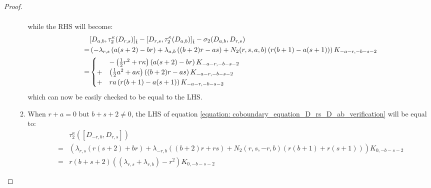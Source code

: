 \begin{proof}
\begin{enumerate}
\begin{enumerate}
$$\begin{aligned}
                                \end{aligned}
                            $$
                        while the RHS will become:
                            $$
                                \begin{aligned}
                                    & [D_{a, b}, \tau_2^{\kappa}(D_{r, s})]_{\extendedtoroidal} - [D_{r, s}, \tau_2^{\kappa}(D_{a, b})]_{\extendedtoroidal} - \sigma_2(D_{a, b}, D_{r, s})
                                    \\
                                    = & \left( -\lambda_{r, s} \left( a(s + 2) - br \right) + \lambda_{a, b} \left( (b + 2) r - as \right) + N_2(r, s, a, b)\left( r(b + 1) - a(s + 1) \right) \right) K_{-a - r, -b - s - 2}
                                    \\
                                    = &
                                    \begin{cases}
                                        & -\left( \frac12 r^2 + r\kappa \right) \left( a(s + 2) - br \right) K_{-a - r, -b - s - 2}
                                        \\
                                        + & \left( \frac12 a^2 + a\kappa \right) \left( (b + 2) r - as \right) K_{-a - r, -b - s - 2} 
                                        \\
                                        + & ra\left( r(b + 1) - a(s + 1) \right) K_{-a - r, -b - s - 2}
                                    \end{cases}
                                \end{aligned}
                            $$
                        which can now be easily checked to be equal to the LHS.
                        \item When $r + a = 0$ but $b + s + 2 \not = 0$, the LHS of equation \eqref{equation: coboundary_equation_D_rs_D_ab_verification} will be equal to:
                            $$
                                \begin{aligned}
                                    & \tau_2^{\kappa}([D_{-r, b}, D_{r, s}])
                                    \\
                                    = & \left( \lambda_{r, s} \left( r(s + 2) + br \right) + \lambda_{-r, b} \left( (b + 2) r + rs \right) + N_2(r, s, -r, b)\left( r(b + 1) + r(s + 1) \right) \right) K_{0, -b - s - 2}
                                    \\
                                    = & r (b + s + 2) \left( (\lambda_{r, s} + \lambda_{r, b}) - r^2 \right) K_{0, -b - s - 2}

\end{aligned}$$
\end{enumerate}
\end{enumerate}
\end{proof}

